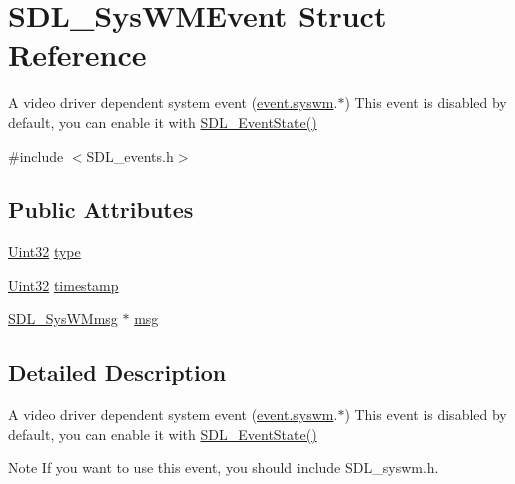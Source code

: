 \hypertarget{struct_s_d_l___sys_w_m_event}{\section{S\-D\-L\-\_\-\-Sys\-W\-M\-Event Struct Reference}
\label{struct_s_d_l___sys_w_m_event}
}


A video driver dependent system event (\hyperlink{union_s_d_l___event_ab3b2eaf5348d4c50a51b1f297fdef537}{event.\-syswm}.$\ast$) This event is disabled by default, you can enable it with \hyperlink{_s_d_l__events_8h_afb772893e1c46f186fa39a4defe76df3}{S\-D\-L\-\_\-\-Event\-State()}  




{\ttfamily \#include $<$S\-D\-L\-\_\-events.\-h$>$}

\subsection*{Public Attributes}
\begin{DoxyCompactItemize}
\item 
\hyperlink{_s_d_l__stdinc_8h_add440eff171ea5f55cb00c4a9ab8672d}{Uint32} \hyperlink{struct_s_d_l___sys_w_m_event_a84697e96cb16bf6a570e10b5bfdcd392}{type}
\item 
\hyperlink{_s_d_l__stdinc_8h_add440eff171ea5f55cb00c4a9ab8672d}{Uint32} \hyperlink{struct_s_d_l___sys_w_m_event_a5d3cb97006d99b620c2671c27bd82c06}{timestamp}
\item 
\hyperlink{struct_s_d_l___sys_w_mmsg}{S\-D\-L\-\_\-\-Sys\-W\-Mmsg} $\ast$ \hyperlink{struct_s_d_l___sys_w_m_event_ad5e3dc68aa15582cd0641847d41c74e8}{msg}
\end{DoxyCompactItemize}


\subsection{Detailed Description}
A video driver dependent system event (\hyperlink{union_s_d_l___event_ab3b2eaf5348d4c50a51b1f297fdef537}{event.\-syswm}.$\ast$) This event is disabled by default, you can enable it with \hyperlink{_s_d_l__events_8h_afb772893e1c46f186fa39a4defe76df3}{S\-D\-L\-\_\-\-Event\-State()} 

\begin{DoxyNote}{Note}
If you want to use this event, you should include S\-D\-L\-\_\-syswm.\-h. 
\end{DoxyNote}


